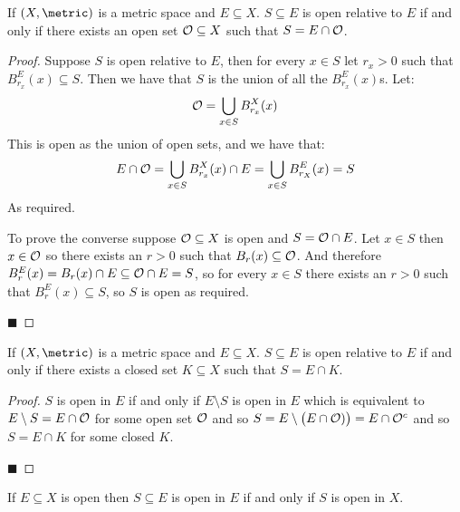 \documentclass[10pt]{article}
\def\openset{{\cal O}}
\begin{document}
\begin{prop*}

    If $(X,\metric)$ is a metric space and $E\subseteq X$.
    $S\subseteq E$ is open relative to $E$ if and only if there exists an open set $\openset\subseteq X$ such that $S=E\cap\openset$.

\end{prop*}

\begin{proof}

    Suppose $S$ is open relative to $E$, then for every $x\in S$ let $r_x>0$ such that $B_{r_x}^E(x)\subseteq S$.
    Then we have that $S$ is the union of all the $B_{r_x}^E(x)$s.
    Let:
    \[ \openset = \bigcup_{x\in S} B_{r_x}^X(x) \]
    This is open as the union of open sets, and we have that:
    \[ E\cap\openset = \bigcup_{x\in S} B_{r_x}^X(x)\cap E = \bigcup_{x\in S}B_{r_X}^E(x) = S \]
    As required.

    To prove the converse suppose $\openset\subseteq X$ is open and $S=\openset\cap E$.
    Let $x\in S$ then $x\in\openset$ so there exists an $r>0$ such that $B_r(x)\subseteq\openset$.
    And therefore $B_r^E(x)=B_r(x)\cap E\subseteq\openset\cap E=S$, so for every $x\in S$ there exists an $r>0$ such that $B_r^E(x)\subseteq S$, so $S$ is open as required.

    \hfill$\blacksquare$

\end{proof}

\begin{prop*}

    If $(X,\metric)$ is a metric space and $E\subseteq X$.
    $S\subseteq E$ is open relative to $E$ if and only if there exists a closed set $K\subseteq X$ such that $S=E\cap K$.

\end{prop*}

\begin{proof}

    $S$ is open in $E$ if and only if $E\setminus S$ is open in $E$ which is equivalent to $E\setminus S=E\cap\openset$ for some open set $\openset$ and so
    $S=E\setminus\bigl(E\cap\openset)\bigr)=E\cap\openset^c$ and so $S=E\cap K$ for some closed $K$.

    \hfill$\blacksquare$

\end{proof}

\begin{prop*}

    If $E\subseteq X$ is open then $S\subseteq E$ is open in $E$ if and only if $S$ is open in $X$.

\end{prop*}
\end{document}
